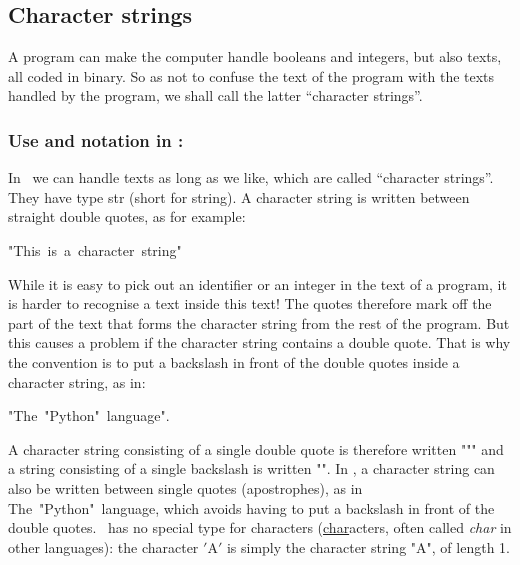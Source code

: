 \subsection{Character strings}

A program can make the computer handle booleans and integers, but
also texts, all coded in binary. So as not to confuse the text of the program
with the texts handled by the program, we shall call the latter ``character
strings''.

\subsubsection{Use and notation in \protect\python:}
In \python\ we can handle texts as long as we like, which are called
``character strings''. They have type {\idt str} (short for {\idt string}). A character string is written between
straight double quotes, as for example:
\begin{center}
{\cha "This\ is\ a\ character\ string"}
\end{center}
While it is easy to pick out an identifier or an integer in the text of a
program, it is harder to recognise a text inside this text! The quotes therefore
mark off the part of the text that forms the character string from the rest of the program. But this causes
a problem if the character string contains a double quote. That is why the convention is to put
a backslash {\cha {}} in front of the double quotes inside a character string,
as in:
\begin{center}
{\cha "The\ "Python"\ language"}.
\end{center}
A character string consisting of a single double quote is therefore written
{\cha """} and a string consisting of a single backslash is written
{\cha ""}. In \python, a character string can also be written between
single quotes (apostrophes), as in {\cha \textquotesingle{}The\ "Python"\ language\textquotesingle{}}, which avoids
having to put a backslash in front of the double quotes. \python\ has no special type
for characters (\underline{char}acters, often called {\em char} in other languages): the character
{\cha $\scriptstyle '$A$\scriptstyle '$} is simply the character string {\cha "A"}, of length 1.

